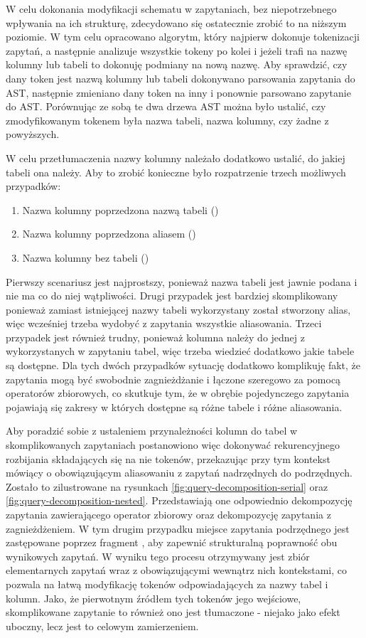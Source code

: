 W celu dokonania modyfikacji schematu w zapytaniach, bez niepotrzebnego wpływania na ich strukturę, zdecydowano się ostatecznie zrobić to na niższym poziomie. W tym celu opracowano algorytm, który najpierw dokonuje tokenizacji zapytań, a następnie analizuje wszystkie tokeny po kolei i jeżeli trafi na nazwę kolumny lub tabeli to dokonuję podmiany na nową nazwę. Aby sprawdzić, czy dany token jest nazwą kolumny lub tabeli dokonywano parsowania zapytania do AST, następnie zmieniano dany token na inny i ponownie parsowano zapytanie do AST. Porównując ze sobą te dwa drzewa AST można było ustalić, czy zmodyfikowanym tokenem była nazwa tabeli, nazwa kolumny, czy żadne z powyższych.

W celu przetłumaczenia nazwy kolumny należało dodatkowo ustalić, do jakiej tabeli ona należy. Aby to zrobić konieczne było rozpatrzenie trzech możliwych przypadków:

\begin{enumerate}
    \item Nazwa kolumny poprzedzona nazwą tabeli ()
    \item Nazwa kolumny poprzedzona aliasem ()
    \item Nazwa kolumny bez tabeli ()
\end{enumerate}

Pierwszy scenariusz jest najprostszy, ponieważ nazwa tabeli jest jawnie podana i nie ma co do niej wątpliwości. Drugi przypadek jest bardziej skomplikowany ponieważ zamiast istniejącej nazwy tabeli wykorzystany został stworzony alias, więc wcześniej trzeba wydobyć z zapytania wszystkie aliasowania. Trzeci przypadek jest również trudny, ponieważ kolumna należy do jednej z wykorzystanych w zapytaniu tabel, więc trzeba wiedzieć dodatkowo jakie tabele są dostępne. Dla tych dwóch przypadków sytuację dodatkowo komplikuję fakt, że zapytania mogą być swobodnie zagnieżdżanie i łączone szeregowo za pomocą operatorów zbiorowych, co skutkuje tym, że w obrębie pojedynczego zapytania pojawiają się zakresy w których dostępne są różne tabele i różne aliasowania.

Aby poradzić sobie z ustaleniem przynależności kolumn do tabel w skomplikowanych zapytaniach postanowiono więc dokonywać rekurencyjnego rozbijania składających się na nie tokenów, przekazując przy tym kontekst mówiący o obowiązującym aliasowaniu z zapytań nadrzędnych do podrzędnych. Zostało to zilustrowane na rysunkach 
\ref{fig:query-decomposition-serial} oraz \ref{fig:query-decomposition-nested}. Przedstawiają one odpowiednio dekompozycję zapytania zawierającego operator zbiorowy oraz dekompozycję zapytania z zagnieżdżeniem. W tym drugim przypadku miejsce zapytania podrzędnego jest zastępowane poprzez fragment , aby zapewnić strukturalną poprawność obu wynikowych zapytań. W wyniku tego procesu otrzymywany jest zbiór elementarnych zapytań wraz z obowiązującymi wewnątrz nich kontekstami, co pozwala na łatwą modyfikację tokenów odpowiadających za nazwy tabel i kolumn. Jako, że pierwotnym źródłem tych tokenów jego wejściowe, skomplikowane zapytanie to również ono jest tłumaczone - niejako jako efekt uboczny, lecz jest to celowym zamierzeniem.

